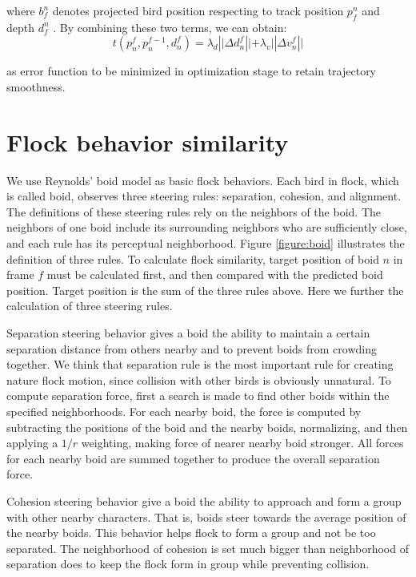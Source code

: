 where $b_f^n$ denotes projected bird position respecting to track position $p_f^n$ and depth $d_f^n$ . By combining these two terms, we can obtain:
\begin{equation}\label{eq:6}
t(p_n^f, p_n^{f-1},d_n^f) = \lambda_d|{|\Delta}d_n^f||+\lambda_v||{\Delta}v_n^f||
\end{equation}


as error function to be minimized in optimization stage to retain trajectory smoothness.


\section{Flock behavior similarity}


We use Reynolds' boid model as basic flock behaviors. Each bird in flock, which is called boid, observes three steering rules: separation, cohesion, and alignment. The definitions of these steering rules rely on the neighbors of the boid. The neighbors of one boid include its surrounding neighbors who are sufficiently close, and each rule has its perceptual neighborhood. Figure \ref{figure:boid} illustrates the definition of three rules. To calculate flock similarity, target position of boid $n$ in frame $f$ must be calculated first, and then compared with the predicted boid position. Target position is the sum of the three rules above. Here we further the calculation of three steering rules.


Separation steering behavior gives a boid the ability to maintain a certain separation distance from others nearby and to prevent boids from crowding together. We think that separation rule is the most important rule for creating nature flock motion, since collision with other birds is obviously unnatural. To compute separation force, first a search is made to find other boids within the specified neighborhoods. For each nearby boid, the force is computed by subtracting the positions of the boid and the nearby boids, normalizing, and then applying a $1/r$ weighting, making force of nearer nearby boid stronger. All forces for each nearby boid are summed together to produce the overall separation force.


Cohesion steering behavior give a boid the ability to approach and form a group with other nearby characters. That is, boids steer towards the average position of the nearby boids. This behavior helps flock to form a group and not be too separated. The neighborhood of cohesion is set much bigger than neighborhood of separation does to keep the flock form in group while preventing collision.


